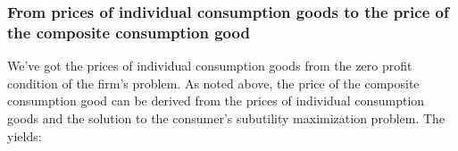 \documentclass[letterpaper,12pt]{article}
\theoremstyle{definition}
\begin{document}
\begin{spacing}{1.5}
%
%
%
%
%
%

\subsubsection*{From prices of individual consumption goods to the price of the composite consumption good}

We've got the prices of individual consumption goods from the zero profit condition of the firm's problem.  As noted above, the price of the composite consumption good can be derived from the prices of individual consumption goods and the solution to the consumer's subutility maximization problem.  The yields:


\end{spacing}
\end{document}
